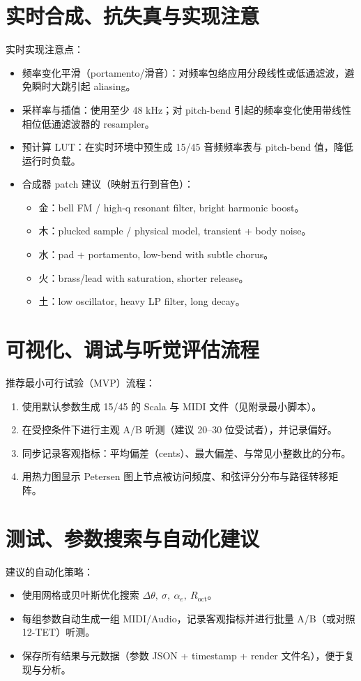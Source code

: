 \documentclass{article}
\begin{document}
\section{实时合成、抗失真与实现注意}
实时实现注意点：
\begin{itemize}
  \item 频率变化平滑（portamento/滑音）：对频率包络应用分段线性或低通滤波，避免瞬时大跳引起 aliasing。
  \item 采样率与插值：使用至少 48 kHz；对 pitch-bend 引起的频率变化使用带线性相位低通滤波器的 resampler。
  \item 预计算 LUT：在实时环境中预生成 15/45 音频频率表与 pitch-bend 值，降低运行时负载。
  \item 合成器 patch 建议（映射五行到音色）：
    \begin{itemize}
      \item 金：bell FM / high-q resonant filter, bright harmonic boost。
      \item 木：plucked sample / physical model, transient + body noise。
      \item 水：pad + portamento, low-bend with subtle chorus。
      \item 火：brass/lead with saturation, shorter release。
      \item 土：low oscillator, heavy LP filter, long decay。
    \end{itemize}
\end{itemize}

\section{可视化、调试与听觉评估流程}
推荐最小可行试验（MVP）流程：
\begin{enumerate}
  \item 使用默认参数生成 15/45 的 Scala 与 MIDI 文件（见附录最小脚本）。
  \item 在受控条件下进行主观 A/B 听测（建议 20–30 位受试者），并记录偏好。
  \item 同步记录客观指标：平均偏差（cents）、最大偏差、与常见小整数比的分布。
  \item 用热力图显示 Petersen 图上节点被访问频度、和弦评分分布与路径转移矩阵。
\end{enumerate}

\section{测试、参数搜索与自动化建议}
建议的自动化策略：
\begin{itemize}
  \item 使用网格或贝叶斯优化搜索 $\Delta\theta,\ \sigma,\ \alpha_e,\ R_{\mathrm{oct}}$。
  \item 每组参数自动生成一组 MIDI/Audio，记录客观指标并进行批量 A/B（或对照 12-TET）听测。
  \item 保存所有结果与元数据（参数 JSON + timestamp + render 文件名），便于复现与分析。
\end{itemize}
\end{document}
